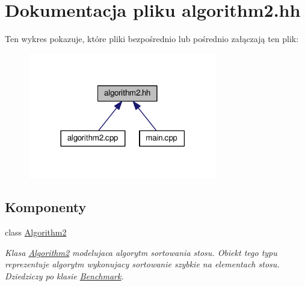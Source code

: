 \hypertarget{algorithm2_8hh}{\section{Dokumentacja pliku algorithm2.\-hh}
\label{algorithm2_8hh}
}
Ten wykres pokazuje, które pliki bezpośrednio lub pośrednio załączają ten plik\-:
\nopagebreak
\begin{figure}[H]
\begin{center}
\leavevmode
\includegraphics[width=234pt]{algorithm2_8hh__dep__incl}
\end{center}
\end{figure}
\subsection*{Komponenty}
\begin{DoxyCompactItemize}
\item 
class \hyperlink{class_algorithm2}{Algorithm2}
\begin{DoxyCompactList}\small\item\em Klasa \hyperlink{class_algorithm2}{Algorithm2} modelujaca algorytm sortowania stosu. Obiekt tego typu reprezentuje algorytm wykonujacy sortowanie szybkie na elementach stosu. Dziedziczy po klasie \hyperlink{class_benchmark}{Benchmark}. \end{DoxyCompactList}\end{DoxyCompactItemize}
